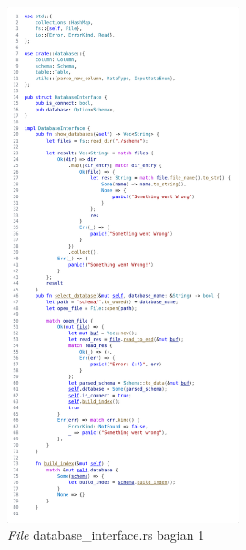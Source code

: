 \begin{figure}[H]
  \centering{}
	\includegraphics[width=0.6\textwidth]{gambar/lampiran/file-database-interface-1.png}
  \caption{\emph{File} database\_interface.rs bagian 1}
\end{figure}

